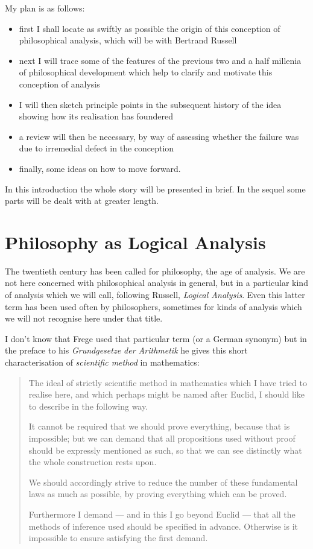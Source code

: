My plan is as follows:

\begin{itemize}
\item first I shall locate as swiftly as possible the origin of this conception of philosophical analysis, which will be with Bertrand Russell
\item next I will trace some of the features of the previous two and a half millenia of philosophical development which help to clarify and motivate this conception of analysis
\item I will then sketch principle points in the subsequent history of the idea showing how its realisation has foundered
\item a review will then be necessary, by way of assessing whether the failure was due to irremedial defect in the conception
\item finally, some ideas on how to move forward.
\end{itemize}

In this introduction the whole story will be presented in brief.
In the sequel some parts will be dealt with at greater length.

\section{Philosophy as Logical Analysis}

The twentieth century has been called for philosophy, the age of analysis.
We are not here concerned with philosophical analysis in general, but in a particular kind of analysis which we will call, following Russell, \emph{Logical Analysis}.
Even this latter term has been used often by philosophers, sometimes for kinds of analysis which we will not recognise here under that title.

I don't know that Frege used that particular term (or a German synonym) but in the preface to his \emph{Grundgesetze der Arithmetik} he gives this short characterisation of \emph{scientific method} in mathematics:
 
\begin{quote}
The ideal of strictly scientific method in mathematics which I have tried to realise here, and which perhaps might be named after Euclid, I should like to describe in the following way.

It cannot be required that we should prove everything, because that is impossible; but we can demand that all propositions used without proof should be expressly mentioned as such, so that we can see distinctly what the whole construction rests upon.
	
We should accordingly strive to reduce the number of these fundamental laws as much as possible, by proving everything which can be proved.
	
Furthermore I demand --- and in this I go beyond Euclid --- that all the methods of inference used should be specified in advance.
Otherwise is it impossible to ensure satisfying the first demand.
\end{quote}

